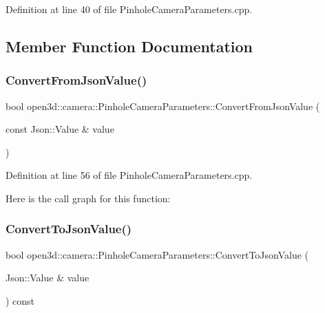 Definition at line 40 of file Pinhole\+Camera\+Parameters.\+cpp.



\subsection{Member Function Documentation}
\mbox{\label{classopen3d_1_1camera_1_1_pinhole_camera_parameters_ae7114228231400130c4d9560a61c8ac0}} 
\subsubsection{\texorpdfstring{ConvertFromJsonValue()}{ConvertFromJsonValue()}}
{\footnotesize\ttfamily bool open3d\+::camera\+::\+Pinhole\+Camera\+Parameters\+::\+Convert\+From\+Json\+Value (\begin{DoxyParamCaption}\item[{const Json\+::\+Value \&}]{value }\end{DoxyParamCaption})\hspace{0.3cm}{\ttfamily [override]}}



Definition at line 56 of file Pinhole\+Camera\+Parameters.\+cpp.

Here is the call graph for this function\+:
\mbox{\label{classopen3d_1_1camera_1_1_pinhole_camera_parameters_a2cee616118b5d635e5b4c1c757b004ae}} 
\subsubsection{\texorpdfstring{ConvertToJsonValue()}{ConvertToJsonValue()}}
{\footnotesize\ttfamily bool open3d\+::camera\+::\+Pinhole\+Camera\+Parameters\+::\+Convert\+To\+Json\+Value (\begin{DoxyParamCaption}\item[{Json\+::\+Value \&}]{value }\end{DoxyParamCaption}) const\hspace{0.3cm}{\ttfamily [override]}}



